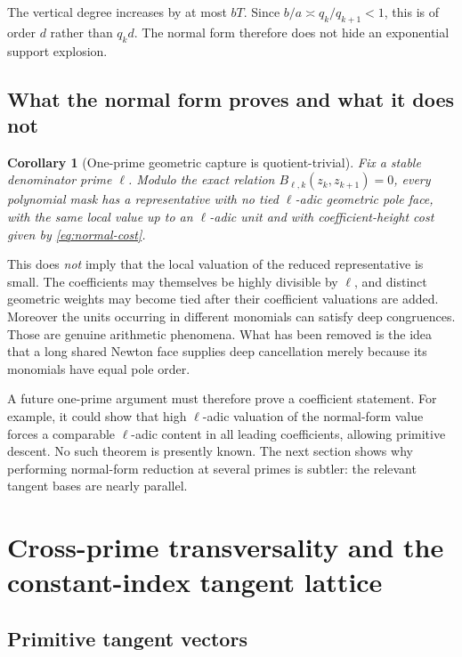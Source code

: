 \documentclass[11pt,oneside]{article}
\newtheorem{corollary}[theorem]{Corollary}
\theoremstyle{definition}
\theoremstyle{remark}
\begin{document}
The vertical degree increases by at most $bT$.  Since $b/a\asymp q_k/q_{k+1}<1$, this is of
order $d$ rather than $q_kd$.  The normal form therefore does not hide an exponential support
explosion.

\subsection{What the normal form proves and what it does not}

\begin{corollary}[One-prime geometric capture is quotient-trivial]
\label{cor:one-prime-trivial}
Fix a stable denominator prime $\ell$.  Modulo the exact relation
$B_{\ell,k}(z_k,z_{k+1})=0$, every polynomial mask has a representative with no tied
$\ell$-adic geometric pole face, with the same local value up to an $\ell$-adic unit and with
coefficient-height cost given by \eqref{eq:normal-cost}.
\end{corollary}

This does \emph{not} imply that the local valuation of the reduced representative is small.
The coefficients may themselves be highly divisible by $\ell$, and distinct geometric
weights may become tied after their coefficient valuations are added.  Moreover the units
occurring in different monomials can satisfy deep congruences.  Those are genuine arithmetic
phenomena.  What has been removed is the idea that a long shared Newton face supplies deep
cancellation merely because its monomials have equal pole order.

A future one-prime argument must therefore prove a coefficient statement.  For example, it
could show that high $\ell$-adic valuation of the normal-form value forces a comparable
$\ell$-adic content in all leading coefficients, allowing primitive descent.  No such theorem
is presently known.  The next section shows why performing normal-form reduction at several
primes is subtler: the relevant tangent bases are nearly parallel.

\section{Cross-prime transversality and the constant-index tangent lattice}
\label{sec:crossprime}

\subsection{Primitive tangent vectors}
\end{document}
